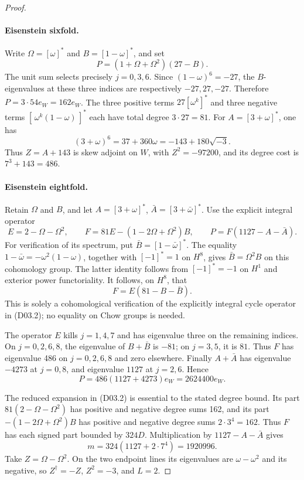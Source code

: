 \begin{proof}
\paragraph{Eisenstein sixfold.}
Write \(\Omega=[\omega]^*\) and \(B=[1-\omega]^*\), and set
\[
 P=(1+\Omega+\Omega^2)(27-B).
\]
The unit sum selects precisely \(j=0,3,6\).
Since \((1-\omega)^6=-27\), the \(B\)-eigenvalues at these
three indices are respectively \(-27,27,-27\).
Therefore \(P=3\cdot54e_W=162e_W\).
The three positive terms \(27[\omega^k]^*\) and three negative
terms \([\,\omega^k(1-\omega)\,]^*\) each have total degree
\(3\cdot27=81\).
For \(A=[3+\omega]^*\), one has
\[
 (3+\omega)^6=37+360\omega=-143+180\sqrt{-3}.
\]
Thus \(Z=A+143\) is skew adjoint on \(W\), with
\(Z^2=-97200\), and its degree cost is \(7^3+143=486\).

\paragraph{Eisenstein eightfold.}
Retain \(\Omega\) and \(B\), and let \(A=[3+\omega]^*\),
\(\bar A=[3+\bar\omega]^*\). Use the explicit integral operator
\[
 E=2-\Omega-\Omega^2,\qquad
 F=81E-(1-2\Omega+\Omega^2)B,\qquad
 P=F(1127-A-\bar A).                                      \tag{D03.2}
\]
For verification of its spectrum, put \(\bar B=[1-\bar\omega]^*\).
The equality \(1-\bar\omega=-\omega^2(1-\omega)\), together with
\([-1]^*=1\) on \(H^8\), gives \(\bar B=\Omega^2B\) on this
cohomology group. The latter identity follows from
\([-1]^*=-1\) on \(H^1\) and exterior power functoriality.
It follows, on \(H^8\), that
\[
 F=E(81-B-\bar B).
\]
This is solely a cohomological verification of the explicitly
integral cycle operator in (D03.2); no equality on Chow groups is
needed.

The operator \(E\) kills \(j=1,4,7\) and has eigenvalue three
on the remaining indices. On \(j=0,2,6,8\), the eigenvalue of
\(B+\bar B\) is \(-81\); on \(j=3,5\), it is \(81\).
Thus \(F\) has eigenvalue 486 on \(j=0,2,6,8\) and zero
elsewhere. Finally \(A+\bar A\) has eigenvalue \(-4273\)
at \(j=0,8\), and eigenvalue \(1127\) at \(j=2,6\).
Hence
\[
 P=486(1127+4273)e_W=2624400e_W.
\]

The reduced expansion in (D03.2) is essential to the stated
degree bound. Its part \(81(2-\Omega-\Omega^2)\) has positive
and negative degree sums 162, and its part
\(-(1-2\Omega+\Omega^2)B\) has positive and negative degree
sums \(2\cdot3^4=162\). Thus \(F\) has each signed part bounded
by \(324D\). Multiplication by \(1127-A-\bar A\) gives
\[
 m=324(1127+2\cdot7^4)=1920996.
\]
Take \(Z=\Omega-\Omega^2\). On the two endpoint lines its
eigenvalues are \(\omega-\omega^2\) and its negative, so
\(Z^\dagger=-Z\), \(Z^2=-3\), and \(L=2\).


\end{proof}
